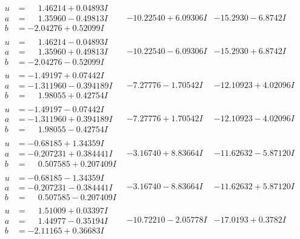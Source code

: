 \documentclass[1p]{elsarticle_modified}
\theoremstyle{definition}
\begin{document}
$$\begin{array}{c|c|c}
\begin{aligned}
u &= \phantom{-}1.46214 + 0.04893 I \\
a &= \phantom{-}1.35960 - 0.49813 I \\
b &= -2.04276 + 0.52099 I\end{aligned}
 & -10.22540 + 6.09306 I & -15.2930 - 6.8742 I \\ \hline\begin{aligned}
u &= \phantom{-}1.46214 - 0.04893 I \\
a &= \phantom{-}1.35960 + 0.49813 I \\
b &= -2.04276 - 0.52099 I\end{aligned}
 & -10.22540 - 6.09306 I & -15.2930 + 6.8742 I \\ \hline\begin{aligned}
u &= -1.49197 + 0.07442 I \\
a &= -1.311960 - 0.394189 I \\
b &= \phantom{-}1.98055 + 0.42754 I\end{aligned}
 & -7.27776 - 1.70542 I & -12.10923 + 4.02096 I \\ \hline\begin{aligned}
u &= -1.49197 - 0.07442 I \\
a &= -1.311960 + 0.394189 I \\
b &= \phantom{-}1.98055 - 0.42754 I\end{aligned}
 & -7.27776 + 1.70542 I & -12.10923 - 4.02096 I \\ \hline\begin{aligned}
u &= -0.68185 + 1.34359 I \\
a &= -0.207231 + 0.384441 I \\
b &= \phantom{-}0.507585 + 0.207409 I\end{aligned}
 & -3.16740 + 8.83664 I & -11.62632 - 5.87120 I \\ \hline\begin{aligned}
u &= -0.68185 - 1.34359 I \\
a &= -0.207231 - 0.384441 I \\
b &= \phantom{-}0.507585 - 0.207409 I\end{aligned}
 & -3.16740 - 8.83664 I & -11.62632 + 5.87120 I \\ \hline\begin{aligned}
u &= \phantom{-}1.51009 + 0.03397 I \\
a &= \phantom{-}1.44977 - 0.35194 I \\
b &= -2.11165 + 0.36683 I\end{aligned}
 & -10.72210 - 2.05778 I & -17.0193 + 0.3782 I \\ \hline\begin{aligned}

\end{aligned}
\end{array}$$
\end{document}
